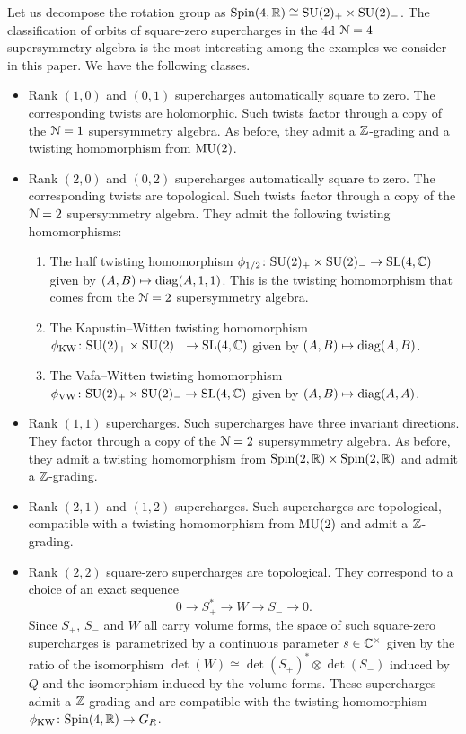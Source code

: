 \documentclass[10pt, oneside]{article}
\begin{document}
Let us decompose the rotation group as $\mathrm{Spin}(4, \mathbb R)\cong \mathrm{SU}(2)_+\times \mathrm{SU}(2)_-$. The classification of orbits of square-zero supercharges in the 4d $\mathcal{N}=4$ supersymmetry algebra is the most interesting among the examples we consider in this paper. We have the following classes. 
\begin{itemize}
\item Rank $(1,0)$ and $(0,1)$ supercharges automatically square to zero. The corresponding twists are holomorphic. Such twists factor through a copy of the $\mathcal N = 1$ supersymmetry algebra. As before, they admit a $\mathbb Z$-grading and a twisting homomorphism from $\mathrm{MU}(2)$.

\item Rank $(2, 0)$ and $(0, 2)$ supercharges automatically square to zero. The corresponding twists are topological. Such twists factor through a copy of the $\mathcal N = 2$ supersymmetry algebra. They admit the following twisting homomorphisms:
 \begin{enumerate}
  \item The half twisting homomorphism $\phi_{\mathrm{1/2}} \colon \mathrm{SU}(2)_+ \times \mathrm{SU}(2)_- \to \mathrm{SL}(4,\mathbb C)$ given by $(A,B) \mapsto \mathrm{diag}(A, 1, 1)$. This is the twisting homomorphism that comes from the $\mathcal N=2$ supersymmetry algebra.
  \item The Kapustin--Witten twisting homomorphism $\phi_{\mathrm{KW}} \colon \mathrm{SU}(2)_+ \times \mathrm{SU}(2)_- \to \mathrm{SL}(4,\mathbb C)$ given by $(A,B) \mapsto \mathrm{diag}(A, B)$.
  \item The Vafa--Witten twisting homomorphism $\phi_{\mathrm{VW}} \colon \mathrm{SU}(2)_+ \times \mathrm{SU}(2)_- \to \mathrm{SL}(4, \mathbb C)$ given by $(A,B) \mapsto \mathrm{diag}(A, A)$.
 \end{enumerate}
 
 \item Rank $(1,1)$ supercharges.  Such supercharges have three invariant directions. They factor through a copy of the $\mathcal N=2$ supersymmetry algebra. As before, they admit a twisting homomorphism from $\mathrm{Spin}(2, \mathbb R)\times \mathrm{Spin}(2, \mathbb R)$ and admit a $\mathbb Z$-grading.

 \item Rank $(2,1)$ and $(1,2)$ supercharges.  Such supercharges are topological, compatible with a twisting homomorphism from $\mathrm{MU}(2)$ and admit a $\mathbb Z$-grading.
 
 \item Rank $(2,2)$ square-zero supercharges are topological. They correspond to a choice of an exact sequence
 \[0\rightarrow S_+^*\rightarrow W\rightarrow S_-\rightarrow 0.\]
 Since $S_+$, $S_-$ and $W$ all carry volume forms, the space of such square-zero supercharges is parametrized by a continuous parameter $s\in\mathbb C^\times$ given by the ratio of the isomorphism $\det(W)\cong \det(S_+)^*\otimes \det(S_-)$ induced by $Q$ and the isomorphism induced by the volume forms. These supercharges admit a $\mathbb Z$-grading and are compatible with the twisting homomorphism $\phi_{\mathrm{KW}}\colon \mathrm{Spin}(4, \mathbb R)\rightarrow G_R$.
\end{itemize}
\end{document}

